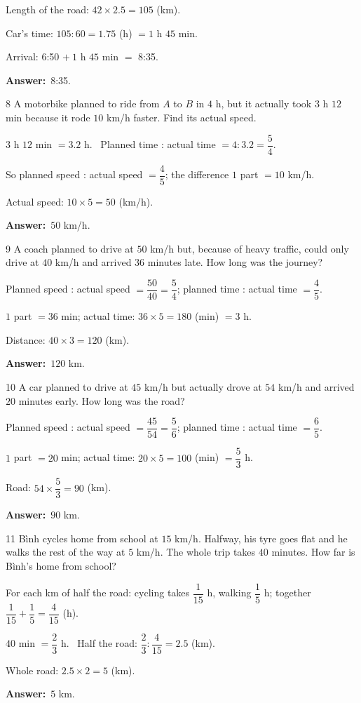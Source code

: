 \documentclass[11pt]{article}
\newif\ifsol \solfalse
\providecommand{\AnsWord}{Đáp số}
\newcommand{\dapso}[1]{\par\textbf{\AnsWord:}\ #1}
\newcommand{\probsol}[1]{%
  \begin{lrbox}{\solmeasure}\begin{minipage}{\dimexpr\linewidth-24pt\relax}#1\end{minipage}\end{lrbox}%
  \ifsol
    \begin{solbox}#1\end{solbox}%
  \else
    \setlength{\solht}{\dimexpr\ht\solmeasure+\dp\solmeasure+0.85cm\relax}%
    \ifdim\solht<1.35cm\setlength{\solht}{1.35cm}\fi
    \begin{tcolorbox}[colback=white,colframe=Line,boxrule=0.8pt,arc=5pt,
      left=8pt,right=8pt,top=4pt,bottom=4pt,height=\solht]{\footnotesize\color{Slate}\itshape\WorkWord}\end{tcolorbox}%
  \fi}
\newcommand{\gap}{\vspace{0.3cm}}
\def\WorkWord{Your work:}
\def\AnsWord{Answer}
\begin{document}
\probsol{
Length of the road: $42\times2.5=105$ (km).\par Car's time: $105:60=1.75$ (h) $=1$ h $45$ min.\par Arrival: 6:50 $+\ 1$ h $45$ min $=$ 8:35.
\dapso{8:35.}}
\gap
\begin{probbox}{8}{\relax}
A motorbike planned to ride from $A$ to $B$ in $4$ h, but it actually took $3$ h $12$ min because it rode $10$ km/h faster. Find its actual speed.
\end{probbox}
\probsol{
$3$ h $12$ min $=3.2$ h. \ Planned time : actual time $=4:3.2=\dfrac54$.\par
So planned speed : actual speed $=\dfrac45$; the difference $1$ part $=10$ km/h.\par Actual speed: $10\times5=50$ (km/h).
\dapso{$50$ km/h.}}
\gap
\begin{probbox}{9}{\relax}
A coach planned to drive at $50$ km/h but, because of heavy traffic, could only drive at $40$ km/h and arrived $36$ minutes late. How long was the journey?
\end{probbox}
\probsol{
Planned speed : actual speed $=\dfrac{50}{40}=\dfrac54$; planned time : actual time $=\dfrac45$.\par
$1$ part $=36$ min; actual time: $36\times5=180$ (min) $=3$ h.\par Distance: $40\times3=120$ (km).
\dapso{$120$ km.}}
\gap
\begin{probbox}{10}{\relax}
A car planned to drive at $45$ km/h but actually drove at $54$ km/h and arrived $20$ minutes early. How long was the road?
\end{probbox}
\probsol{
Planned speed : actual speed $=\dfrac{45}{54}=\dfrac56$; planned time : actual time $=\dfrac65$.\par
$1$ part $=20$ min; actual time: $20\times5=100$ (min) $=\dfrac53$ h.\par Road: $54\times\dfrac53=90$ (km).
\dapso{$90$ km.}}
\gap
\begin{probbox}{11}{\relax}
Bình cycles home from school at $15$ km/h. Halfway, his tyre goes flat and he walks the rest of the way at $5$ km/h. The whole trip takes $40$ minutes. How far is Bình's home from school?
\end{probbox}
\probsol{
For each km of half the road: cycling takes $\dfrac1{15}$ h, walking $\dfrac15$ h; together $\dfrac1{15}+\dfrac15=\dfrac4{15}$ (h).\par
$40$ min $=\dfrac23$ h. \ Half the road: $\dfrac23:\dfrac4{15}=2.5$ (km).\par Whole road: $2.5\times2=5$ (km).
\dapso{$5$ km.}}
\end{document}
